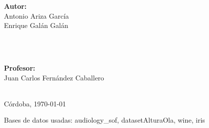 \begin{titlepage}
\begin{center}
		\begin{minipage}{0.5\textwidth}
            \begin{center}
                \textbf{Autor:}\\
                Antonio Ariza García\\
                Enrique Galán Galán
            \end{center}
        \end{minipage}\\[0.5cm]
        ~
        \begin{minipage}{0.5\textwidth}
            \begin{center}
                \textbf{Profesor:}\\
                Juan Carlos Fernández Caballero
            \end{center}
        \end{minipage}\\
        
        \vfill\vfill\vfill\vfill
        {\large Córdoba, \today}
        
	\end{center}
	Bases de datos usadas: audiology\_sof, datasetAlturaOla, wine, iris
\end{titlepage}